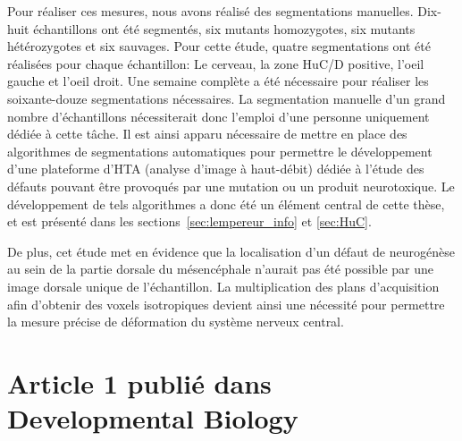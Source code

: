 \documentclass[\main/main.tex]{subfiles}
\begin{document}
%
Pour réaliser ces mesures, nous avons réalisé des segmentations manuelles.
%
Dix-huit échantillons ont été segmentés,
six mutants homozygotes, six mutants hétérozygotes et six sauvages.
%
Pour cette étude, quatre segmentations ont été réalisées pour chaque échantillon:
Le cerveau, la zone HuC/D positive, l'oeil gauche et l'oeil droit.
%
Une semaine complète a été nécessaire pour réaliser les soixante-douze segmentations nécessaires.
%
La segmentation manuelle d'un grand nombre d'échantillons
nécessiterait donc l'emploi d'une personne uniquement dédiée à cette tâche.
%
Il est ainsi apparu nécessaire de mettre en place des algorithmes de segmentations automatiques
pour permettre le développement d'une plateforme d'HTA (analyse d'image à haut-débit) dédiée à l'étude
des défauts pouvant être provoqués par une mutation ou un produit neurotoxique.
%
Le développement de tels algorithmes a donc été un élément central de cette thèse, et est présenté dans les sections~\ref{sec:lempereur_info} et \ref{sec:HuC}.

De plus, cet étude met en évidence que la localisation d'un défaut de neurogénèse au sein de la partie dorsale du
mésencéphale n'aurait pas été possible par une image dorsale unique de l'échantillon.
%
La multiplication des plans d'acquisition  afin d'obtenir des voxels isotropiques devient ainsi une nécessité
pour permettre la mesure précise de déformation du système nerveux central.

\section{Article 1 publié dans Developmental Biology}


\end{document}

